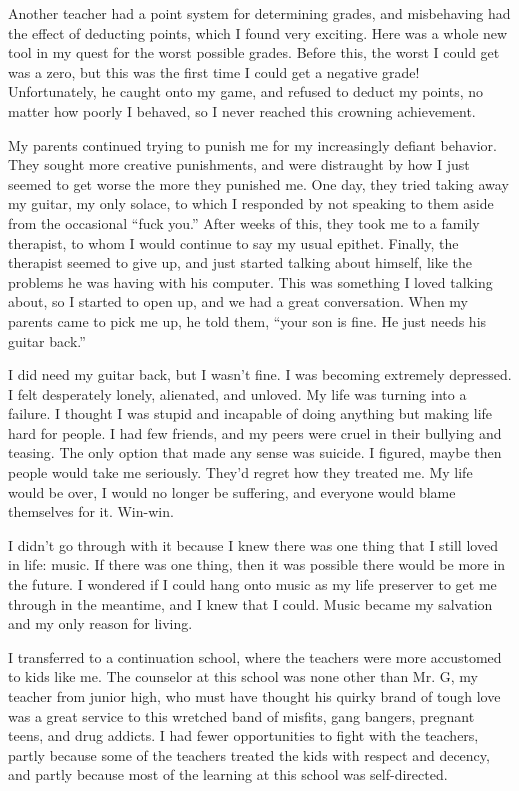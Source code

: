 Another teacher had a point system for determining grades, and misbehaving had the effect of deducting points, which I found very exciting. Here was a whole new tool in my quest for the worst possible grades. Before this, the worst I could get was a zero, but this was the first time I could get a negative grade! Unfortunately, he caught onto my game, and refused to deduct my points, no matter how poorly I behaved, so I never reached this crowning achievement.

My parents continued trying to punish me for my increasingly defiant behavior. They sought more creative punishments, and were distraught by how I just seemed to get worse the more they punished me. One day, they tried taking away my guitar, my only solace, to which I responded by not speaking to them aside from the occasional ``fuck you.'' After weeks of this, they took me to a family therapist, to whom I would continue to say my usual epithet. Finally, the therapist seemed to give up, and just started talking about himself, like the problems he was having with his computer. This was something I loved talking about, so I started to open up, and we had a great conversation. When my parents came to pick me up, he told them, ``your son is fine. He just needs his guitar back.''

I did need my guitar back, but I wasn't fine. I was becoming extremely depressed. I felt desperately lonely, alienated, and unloved. My life was turning into a failure. I thought I was stupid and incapable of doing anything but making life hard for people. I had few friends, and my peers were cruel in their bullying and teasing. The only option that made any sense was suicide. I figured, maybe then people would take me seriously. They'd regret how they treated me. My life would be over, I would no longer be suffering, and everyone would blame themselves for it. Win-win.

I didn't go through with it because I knew there was one thing that I still loved in life: music. If there was one thing, then it was possible there would be more in the future. I wondered if I could hang onto music as my life preserver to get me through in the meantime, and I knew that I could. Music became my salvation and my only reason for living.

I transferred to a continuation school, where the teachers were more accustomed to kids like me. The counselor at this school was none other than Mr. G, my teacher from junior high, who must have thought his quirky brand of tough love was a great service to this wretched band of misfits, gang bangers, pregnant teens, and drug addicts. I had fewer opportunities to fight with the teachers, partly because some of the teachers treated the kids with respect and decency, and partly because most of the learning at this school was self-directed.


